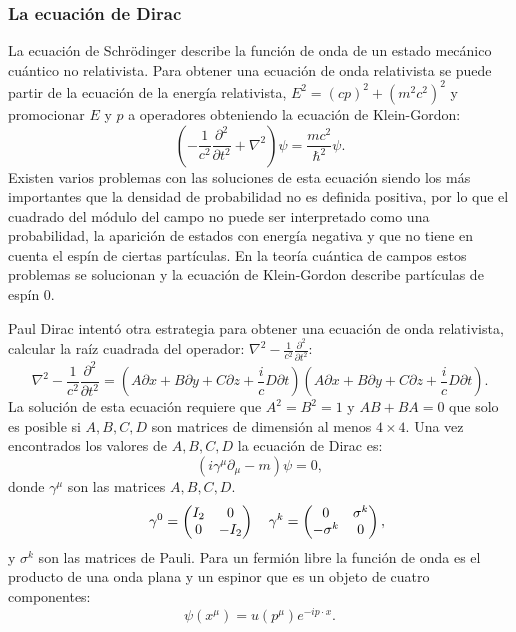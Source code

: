 \documentclass{article}
\theoremstyle{plain}
\theoremstyle{definition}
\begin{document}
	\subsubsection{La ecuación de Dirac}
	La ecuación de Schr\"{o}dinger describe la función de onda de un estado mecánico cuántico no relativista. Para obtener una ecuación de onda relativista se puede partir de la ecuación de la energía relativista, \(E^2=(cp)^2 + (m^2c^2)^2\) y promocionar \(E\) y \(p\) a operadores obteniendo la ecuación de Klein-Gordon: 
	\[
	\left(-\frac{1}{c^2}\frac{\partial^2}{\partial t^2}+\nabla^2\right)\psi = \frac{mc^2}{\hbar^2}\psi\text{.}
	\]
	Existen varios problemas con las soluciones de esta ecuación siendo los más importantes que la densidad de probabilidad no es definida positiva, por lo que el cuadrado del módulo del campo no puede ser interpretado como una probabilidad, la aparición de estados con energía negativa y que no tiene en cuenta el espín de ciertas partículas. En la teoría cuántica de campos estos problemas se solucionan y la ecuación de Klein-Gordon describe partículas de espín 0.\par
	Paul Dirac intentó otra estrategia para obtener una ecuación de onda relativista, calcular la raíz cuadrada del operador: \(\nabla^2-\frac{1}{c^2}\frac{\partial^2}{\partial t^2} \): \[
	\nabla^2-\frac{1}{c^2}\frac{\partial^2}{\partial t^2} = \left(A\partial x + B\partial y+C\partial z+\frac{i}{c}D\partial t \right)\left(A\partial x + B\partial y+C\partial z+\frac{i}{c}D\partial t \right) \text{.}
	\]
	La solución de esta ecuación requiere que \(A^2 =B^2=1\) y \(AB+BA=0\) que solo es posible si \(A,B,C,D\) son  matrices de dimensión al menos \(4\times 4\). Una vez encontrados los valores de \(A,B,C,D\) la ecuación de Dirac es:
	\begin{dmath}\label{EcuacionDirac}
		\left(i\gamma^\mu\partial_{\mu}-m\right)\psi=0,
	\end{dmath} 
	donde \(\gamma^\mu\) son las matrices \(A,B,C,D \text{.}\)
	\[\quad \gamma^0 =\left(\begin{array}{@{}cc@{}}
	I_2 & 0 \\
	0 & -I_2
	\end{array}
	\right)
	\quad
	\gamma^k = \left(\begin{array}{@{}cc@{}}
	0 & \sigma^k \\
	-\sigma^k & 0
	\end{array}
	\right),\]
	y \(\sigma^k \) son las matrices de Pauli. Para un fermión libre la función de onda es el producto de una onda plana y un espinor que es un objeto de cuatro componentes:\[\psi(x^\mu)=u(p^\mu)e^{-ip\cdot x}\text{.} \]
\end{document}
